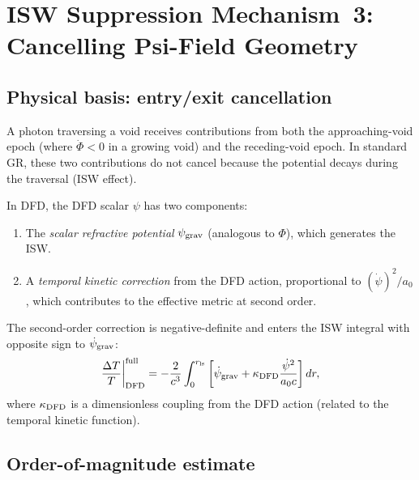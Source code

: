 \documentclass[11pt]{article}
\newcommand{\DFD}{{\rm DFD}}
\newcommand{\deltaT}{\Delta T}
\begin{document}
\section{ISW Suppression Mechanism~3: Cancelling Psi-Field Geometry}
\label{sec:mechanism3-cancellation}

\subsection{Physical basis: entry/exit cancellation}

A photon traversing a void receives contributions from both the
approaching-void epoch (where $\dot\Phi < 0$ in a growing void)
and the receding-void epoch.  In standard GR, these two contributions
do not cancel because the potential decays during the traversal
(ISW effect).

In DFD, the DFD scalar $\psi$ has two components:
\begin{enumerate}[label=(\roman*)]
  \item The \emph{scalar refractive potential} $\psi_{\rm grav}$ (analogous
    to $\Phi$), which generates the ISW.
  \item A \emph{temporal kinetic correction} from the DFD action,
    proportional to $(\dot\psi)^2/a_0$, which contributes to the
    effective metric at second order.
\end{enumerate}
The second-order correction is negative-definite and enters the ISW
integral with opposite sign to $\dot\psi_{\rm grav}$:
\begin{equation}\label{eq:isw-cancel}
  \frac{\deltaT}{T}\bigg|_{\DFD}^{\rm full}
  = -\frac{2}{c^3}\int_0^{r_{\rm ls}}
    \left[\dot\psi_{\rm grav} + \kappa_{\DFD}\frac{\dot\psi^2}{a_0 c}\right]dr,
\end{equation}
where $\kappa_{\DFD}$ is a dimensionless coupling from the DFD action
(related to the temporal kinetic function).

\subsection{Order-of-magnitude estimate}
\end{document}
